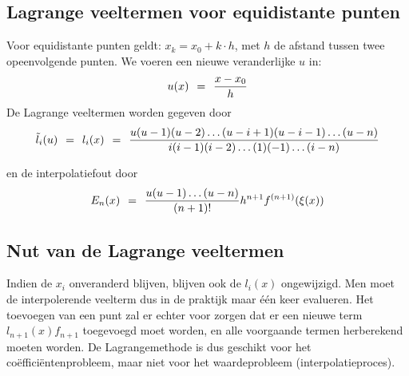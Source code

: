 \documentclass[11pt]{report}
\def \eq {\hspace{1.5mm}=\hspace{1.5mm}}
\begin{document}
\subsection{Lagrange veeltermen voor equidistante punten}
	Voor equidistante punten geldt: $x_k = x_0 + k\cdot h$, met $h$ de afstand tussen twee opeenvolgende punten. We voeren een nieuwe veranderlijke $u$ in:
	$$u(x) \eq \frac{x - x_0}{h}$$
	De Lagrange veeltermen worden gegeven door
	\begin{equation}
		\tilde l_i(u) \eq l_i(x) \eq \frac{u(u-1)(u-2)\dots(u-i+1)(u-i-1)\dots(u-n)}{i(i-1)(i-2)\dots(1)(-1)\dots(i-n)}
	\end{equation}
	
	en de interpolatiefout door
	\begin{equation}
		E_n(x) \eq \frac{u(u-1)\dots(u-n)}{(n+1)!}h^{n+1}f^{(n+1)}(\xi(x))
	\end{equation}
\subsection{Nut van de Lagrange veeltermen}
	Indien de $x_i$ onveranderd blijven, blijven ook de $l_i(x)$ ongewijzigd. Men moet de interpolerende veelterm dus in de praktijk maar \'{e}\'{e}n keer evalueren. Het toevoegen van een punt zal er echter voor zorgen dat er een nieuwe term $l_{n+1}(x)f_{n+1}$ toegevoegd moet worden, en alle voorgaande termen herberekend moeten worden. De Lagrangemethode is dus geschikt voor het co\"{e}ffici\"{e}ntenprobleem, maar niet voor het waardeprobleem (interpolatieproces).
	
\end{document}
